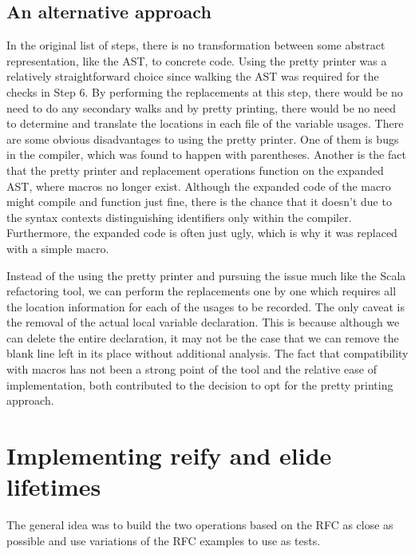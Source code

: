 \subsection{An alternative approach}
In the original list of steps, there is no transformation between some abstract representation, like the AST, to concrete code. Using the pretty printer was a relatively straightforward choice since walking the AST was required for the checks in Step 6. By performing the replacements at this step, there would be no need to do any secondary walks and by pretty printing, there would be no need to determine and translate the locations in each file of the variable usages. There are some obvious disadvantages to using the pretty printer. One of them is bugs in the compiler, which was found to happen with parentheses. Another is the fact that the pretty printer and replacement operations function on the expanded AST, where macros no longer exist. Although the expanded code of the macro might compile and function just fine, there is the chance that it doesn't due to the syntax contexts distinguishing identifiers only within the compiler. Furthermore, the expanded code is often just ugly, which is why it was replaced with a simple macro.

Instead of the using the pretty printer and pursuing the issue much like the Scala refactoring tool, we can perform the replacements one by one which requires all the location information for each of the usages to be recorded. The only caveat is the removal of the actual local variable declaration. This is because although we can delete the entire declaration, it may not be the case that we can remove the blank line left in its place without additional analysis. The fact that compatibility with macros has not been a strong point of the tool and the relative ease of implementation, both contributed to the decision to opt for the pretty printing approach.

\section{Implementing reify and elide lifetimes}\label{S:lifetimeref}
The general idea was to build the two operations based on the RFC as close as possible and use variations of the RFC examples to use as tests.

